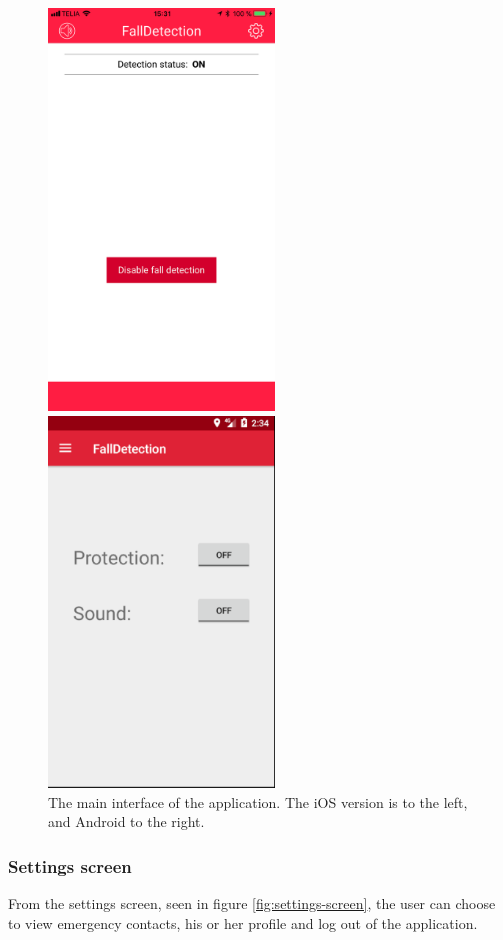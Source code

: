 \documentclass[12pt, a4paper, onecolumn]{article}
\begin{document}
	\begin{figure}[H]
		\begin{multicols}{2}
			\centering
			\includegraphics[width=6cm]{../img/screenshots/main-screen.jpg}\par 
			\includegraphics[width=6cm]{../img/screenshots/main-screen-android.png}\par 
		\end{multicols}
		\caption{The main interface of the application. The iOS version is to the left, and Android to the right.}%
		\label{fig:main-screen}%
	\end{figure}
	
	\newpage
	\subsubsection{Settings screen}
	From the settings screen, seen in figure \ref{fig:settings-screen}, the user can choose to view emergency contacts, his or her profile and log out of the application.
	
\end{document}

